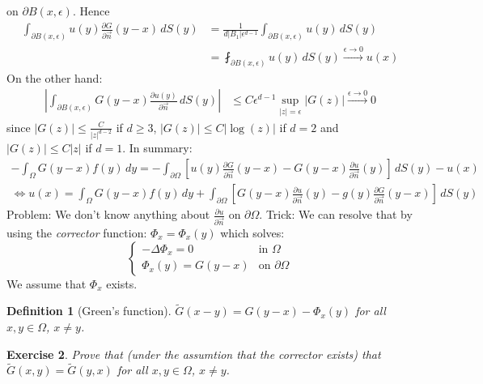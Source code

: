 \documentclass{report}
\theoremstyle{tommy}
\newtheorem{defn}{Definition}
\newtheorem{ex}[defn]{Exercise}
\begin{document}
  on \(\partial B(x, \epsilon)\). Hence
  \begin{align*}
    \int_{\partial B(x, \epsilon)} u(y) \frac{\partial G}{\partial \vec{n}}(y-x) \, dS(y) 
    &= \frac{1}{d|B_1| \epsilon^{d-1}} \int_{\partial B(x, \epsilon)} u(y) \, dS(y) \\
    &= \fint_{\partial B(x,\epsilon)} u(y) \, dS(y)
    \xrightarrow{\epsilon \to 0} u(x) 
  \end{align*}
  On the other hand:
  \begin{align*}
    \left|\int_{\partial B(x, \epsilon)} G(y-x) \frac{\partial u(y)}{\partial \vec{n}} \, dS(y)\right|
    &\le C \epsilon^{d-1} \sup_{|z| = \epsilon} |G(z)| \xrightarrow{\epsilon \to 0} 0
  \end{align*}
  since \(|G(z)|\le \frac{C}{|z|^{d-2}}\) if \(d \ge 3\), \(|G(z)|\le C |\log(z)| \) if \(d = 2\) and \(|G(z)|\le C|z|\) if \(d = 1\). In summary: 
  \begin{align*}
    - \int_\Omega G(y-x) f(y) \, dy 
    = - \int_{\partial \Omega} \left[u(y) \frac{\partial G}{\partial \vec{n}} (y-x) - G(y-x) \frac{\partial u}{\partial \vec{n}}(y)\right] \, dS(y) - u(x) \\
    \Leftrightarrow u(x) = \int_\Omega G(y-x) f(y) \, dy + \int_{\partial \Omega} \left[G(y-x) \frac{\partial u}{\partial \vec{n}}(y) - g(y) \frac{\partial G}{\partial \vec{n}}(y-x)\right] \, dS(y)
  \end{align*}
  Problem: We don't know anything about \(\frac{\partial u}{\partial \vec{n}}\) on \(\partial \Omega\). Trick: We can resolve that by using the \emph{corrector} function: \(\Phi_x = \Phi_x(y)\) which solves:
  \[\begin{cases}
    - \Delta \Phi_x = 0 & \text{in } \Omega \\ \Phi_x(y) = G(y-x) &\text{on } \partial \Omega
  \end{cases}\]
  We assume that \(\Phi_x\) exists. 

  \begin{defn}[Green's function]
    \(\tilde G(x-y) = G(y-x) - \Phi_x(y)\) for all \(x,y \in \Omega\), \(x \ne y\).
  \end{defn}
  
  \begin{ex}
    Prove that (under the assumtion that the corrector exists) that \(\tilde G(x,y) = \tilde G(y,x)\) for all \(x,y \in \Omega\), \(x \ne y\).
  \end{ex}
  
\end{document}
